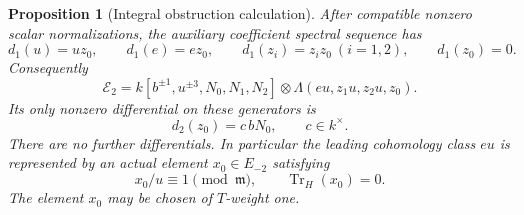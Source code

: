 \documentclass[11pt]{article}
\newtheorem{proposition}[theorem]{Proposition}
\theoremstyle{definition}
\theoremstyle{remark}
\numberwithin{equation}{section}
\begin{document}
\begin{proposition}[Integral obstruction calculation]
\label{coef:integral-lift}
After compatible nonzero scalar normalizations, the auxiliary
coefficient spectral sequence has
\[
 d_1(u)=uz_0,\qquad
 d_1(e)=ez_0,\qquad
 d_1(z_i)=z_i z_0\ (i=1,2),\qquad d_1(z_0)=0.
\]
Consequently
\begin{equation}\label{coef:second-page}
 \mathcal E_2
 =k[b^{\pm1},u^{\pm3},N_0,N_1,N_2]
       \otimes\Lambda(eu,z_1u,z_2u,z_0).
\end{equation}
Its only nonzero differential on these generators is
\[
 d_2(z_0)=c\,bN_0,\qquad c\in k^\times.
\]
There are no further differentials.  In particular the leading
cohomology class \(eu\) is represented by an actual element
\(x_0\in E_{-2}\) satisfying
\[
 x_0/u\equiv1\pmod{\mathfrak m},\qquad
 \operatorname{Tr}_H(x_0)=0.
\]
The element \(x_0\) may be chosen of \(T\)-weight one.
\end{proposition}
\end{document}
